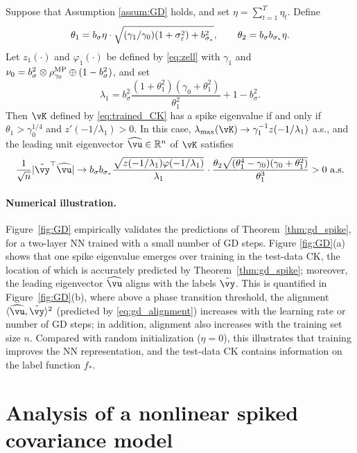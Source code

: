 \begin{theorem}\label{thm:gd_spike}
Suppose that Assumption \ref{assum:GD} holds, and set
$\eta=\sum_{t=1}^T \eta_t$. Define  
\begin{equation}\label{def:theta_12}
\theta_1= b_\sigma\eta\cdot\sqrt{(\gamma_1/\gamma_0)(1+\sigma_\varepsilon^2) +
b_{\sigma_*}^{2}}, \qquad
\theta_2=b_\sigma b_{\sigma_*}\eta.
\end{equation} 
Let $z_1(\cdot)$ and $\varphi_1(\cdot)$ be defined by \eqref{eq:zell} with
$\gamma_1$ and $\nu_0=b_\sigma^2\otimes\rho^{\textnormal{MP}}_{\gamma_0} \oplus (1-b_\sigma^2)$, and set
\[\lambda_1=b_\sigma^2\frac{(1+\theta_1^2)(\gamma_0+\theta_1^2)}{\theta_1^2}+1-b_\sigma^2.\]
Then $\vK$ defined by \eqref{eq:trained_CK} has a spike eigenvalue if and only
if $\theta_1>\gamma_0^{1/4}$ and $z'(-1/\lambda_1)>0$. In this case,
$\lambda_{\max}(\vK) \to \gamma_1^{-1}z(-1/\lambda_1)$ a.s.,
and the leading unit eigenvector $\widehat \vu\in\R^n$ of $\vK$ satisfies
\begin{equation}\label{eq:gd_alignment}
\frac{1}{\sqrt{n}}|\tilde{\vy}^\top \widehat\vu|\to b_\sigma b_{\sigma_*}
\frac{\sqrt{z(-1/\lambda_1)\varphi(-1/\lambda_1)}}{\lambda_1}\cdot
\frac{\theta_2\sqrt{(\theta_1^4-\gamma_0)(\gamma_0+\theta_1^2)}}{\theta_1^3}>0
\text{ a.s.}
\end{equation}
\end{theorem}

\paragraph{Numerical illustration.}
Figure~\ref{fig:GD} empirically validates the predictions of
Theorem~\ref{thm:gd_spike}, for a two-layer NN trained with a small number of
GD steps.
Figure \ref{fig:GD}(a) shows that one spike eigenvalue emerges over training in the test-data CK, the location of which is accurately predicted by Theorem~\ref{thm:gd_spike}; 
moreover, the leading eigenvector $\widehat{\vu}$ aligns with the labels $\tilde{\vy}$. 
This is quantified in Figure~\ref{fig:GD}(b), where above a phase transition
threshold, the alignment $\langle\widehat{\vu},\tilde{\vy}\rangle^2$ (predicted
by \eqref{eq:gd_alignment}) increases with the learning rate or number of GD steps; 
in addition, alignment also increases with the training set size $n$.
Compared with random initialization ($\eta=0$), this illustrates that training
improves the NN representation, and the test-data CK contains information on the label function $f_*$. 

\section{Analysis of a nonlinear spiked covariance model}\label{sec:proof_overview}

